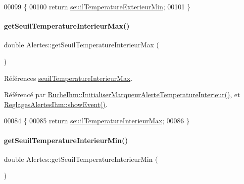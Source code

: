 \begin{DoxyCode}
00099 \{
00100     \textcolor{keywordflow}{return} \hyperlink{class_alertes_a0898c501edf5f07ac503b31b8a3d2454}{seuilTemperatureExterieurMin};
00101 \}
\end{DoxyCode}
\mbox{\label{class_alertes_ac514ebef5e7e65aa7bee0ebe3cd7e883}} 
\paragraph{\texorpdfstring{get\+Seuil\+Temperature\+Interieur\+Max()}{getSeuilTemperatureInterieurMax()}}
{\footnotesize\ttfamily double Alertes\+::get\+Seuil\+Temperature\+Interieur\+Max (\begin{DoxyParamCaption}{ }\end{DoxyParamCaption})}



Références \hyperlink{class_alertes_abeda87298576a3b3eefcca9a96b8a0a9}{seuil\+Temperature\+Interieur\+Max}.



Référencé par \hyperlink{class_ruche_ihm_a0f44cb030202047fa9a364dfcbf9a13f}{Ruche\+Ihm\+::\+Initialiser\+Marqueur\+Alerte\+Temperature\+Interieur()}, et \hyperlink{class_reglages_alertes_ihm_af47504b34ab0213fce9269c08b9e5544}{Reglages\+Alertes\+Ihm\+::show\+Event()}.


\begin{DoxyCode}
00084 \{
00085     \textcolor{keywordflow}{return} \hyperlink{class_alertes_abeda87298576a3b3eefcca9a96b8a0a9}{seuilTemperatureInterieurMax};
00086 \}
\end{DoxyCode}
\mbox{\label{class_alertes_af61b11556d97f923cf7dd25ac4f5dd05}} 
\paragraph{\texorpdfstring{get\+Seuil\+Temperature\+Interieur\+Min()}{getSeuilTemperatureInterieurMin()}}
{\footnotesize\ttfamily double Alertes\+::get\+Seuil\+Temperature\+Interieur\+Min (\begin{DoxyParamCaption}{ }\end{DoxyParamCaption})}



